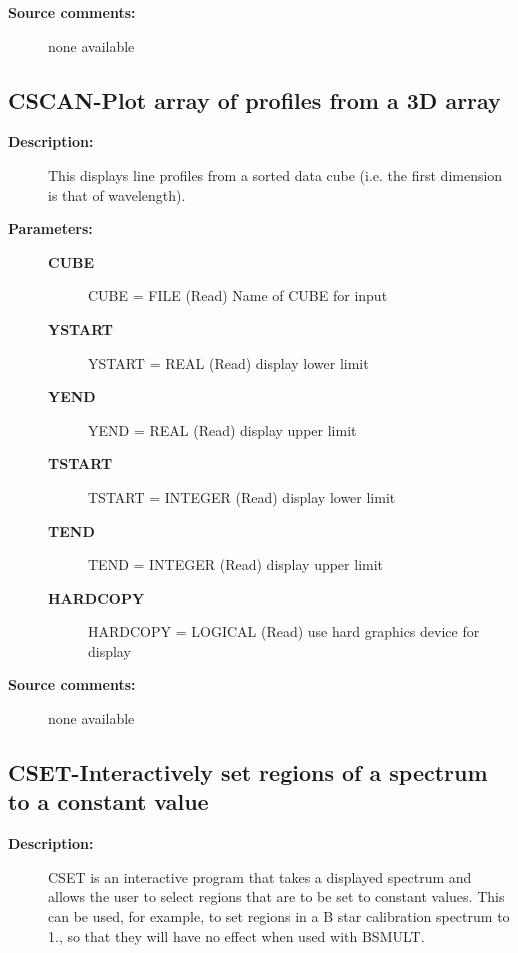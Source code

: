 \begin{description}
\begin{description}
\item [\textbf{Source comments:}]
\begin{terminalv}
  none available

\end{terminalv}
\end{description}
\subsection{CSCAN-\label{CSCAN}Plot array of profiles from a 3D array}
\begin{description}

\item [\textbf{Description:}]
   This displays line profiles
   from a sorted data cube (i.e. the first dimension is that of
   wavelength).

\item [\textbf{Parameters:}]
\begin{description}
\item [\textbf{CUBE}]
    CUBE = FILE (Read)
        Name of CUBE for input
\item [\textbf{YSTART}]
    YSTART = REAL (Read)
        display lower limit
\item [\textbf{YEND}]
    YEND = REAL (Read)
        display upper limit
\item [\textbf{TSTART}]
    TSTART = INTEGER (Read)
        display lower limit
\item [\textbf{TEND}]
    TEND = INTEGER (Read)
        display upper limit
\item [\textbf{HARDCOPY}]
    HARDCOPY = LOGICAL (Read)
        use hard graphics device for display
\end{description}

\item [\textbf{Source comments:}]
\begin{terminalv}
  none available

\end{terminalv}
\end{description}
\subsection{CSET-\label{CSET}Interactively set regions of a spectrum to a constant value}
\begin{description}

\item [\textbf{Description:}]
 CSET is an interactive program that takes a displayed spectrum
 and allows the user to select regions that are to be set to
 constant values.  This can be used, for example, to set regions
 in a B star calibration spectrum to 1., so that they will have
 no effect when used with BSMULT.


\end{description}
\end{description}
